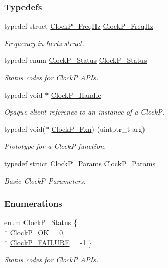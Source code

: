 \subsubsection*{Typedefs}
\begin{DoxyCompactItemize}
\item 
typedef struct \hyperlink{struct_clock_p___freq_hz}{Clock\+P\+\_\+\+Freq\+Hz} \hyperlink{_clock_p_8h_a25fc160d58d458b85ec41dea37eaf902}{Clock\+P\+\_\+\+Freq\+Hz}
\begin{DoxyCompactList}\small\item\em Frequency-\/in-\/hertz struct. \end{DoxyCompactList}\item 
typedef enum \hyperlink{_clock_p_8h_aa2030f172fe0c2dbc9ac0b082933c767}{Clock\+P\+\_\+\+Status} \hyperlink{_clock_p_8h_ae1edd74163efee26d095e9a3d37f5a05}{Clock\+P\+\_\+\+Status}
\begin{DoxyCompactList}\small\item\em Status codes for Clock\+P A\+P\+Is. \end{DoxyCompactList}\item 
typedef void $\ast$ \hyperlink{_clock_p_8h_a003dd74e948999fe5c3f45d8f51501f1}{Clock\+P\+\_\+\+Handle}
\begin{DoxyCompactList}\small\item\em Opaque client reference to an instance of a Clock\+P. \end{DoxyCompactList}\item 
typedef void($\ast$ \hyperlink{_clock_p_8h_af516e3c763bec8fb9769ecc4ac7296bb}{Clock\+P\+\_\+\+Fxn}) (uintptr\+\_\+t arg)
\begin{DoxyCompactList}\small\item\em Prototype for a Clock\+P function. \end{DoxyCompactList}\item 
typedef struct \hyperlink{struct_clock_p___params}{Clock\+P\+\_\+\+Params} \hyperlink{_clock_p_8h_a5c7625ee9fd43a5753a76382f81ca0eb}{Clock\+P\+\_\+\+Params}
\begin{DoxyCompactList}\small\item\em Basic Clock\+P Parameters. \end{DoxyCompactList}\end{DoxyCompactItemize}
\subsubsection*{Enumerations}
\begin{DoxyCompactItemize}
\item 
enum \hyperlink{_clock_p_8h_aa2030f172fe0c2dbc9ac0b082933c767}{Clock\+P\+\_\+\+Status} \{ \\*
\hyperlink{_clock_p_8h_aa2030f172fe0c2dbc9ac0b082933c767a300c7c353a0ae1d107c2b2278a40a09b}{Clock\+P\+\_\+\+O\+K} = 0, 
\\*
\hyperlink{_clock_p_8h_aa2030f172fe0c2dbc9ac0b082933c767a2033a09c166a62496eeb184d0c736a67}{Clock\+P\+\_\+\+F\+A\+I\+L\+U\+R\+E} = -\/1
 \}
\begin{DoxyCompactList}\small\item\em Status codes for Clock\+P A\+P\+Is. \end{DoxyCompactList}\end{DoxyCompactItemize}
